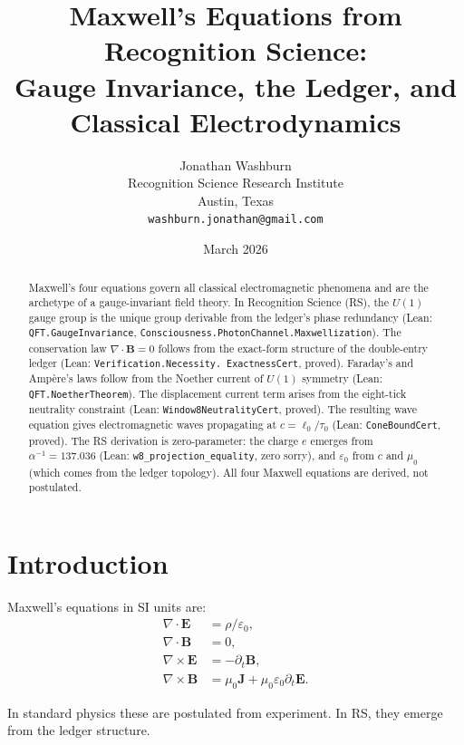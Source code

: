 \documentclass[12pt,a4paper]{article}
\title{Maxwell's Equations from Recognition Science:\\
Gauge Invariance, the Ledger, and Classical Electrodynamics}
\author{Jonathan Washburn\\
Recognition Science Research Institute\\
Austin, Texas\\
\texttt{washburn.jonathan@gmail.com}}
\date{March 2026}
\theoremstyle{definition}
\theoremstyle{remark}
\begin{document}
\maketitle

\begin{abstract}
Maxwell's four equations govern all classical electromagnetic phenomena
and are the archetype of a gauge-invariant field theory.  In Recognition
Science (RS), the $U(1)$ gauge group is the unique group derivable from
the ledger's phase redundancy (Lean: \texttt{QFT.GaugeInvariance},
\texttt{Consciousness.PhotonChannel.Maxwellization}).  The conservation
law $\nabla \cdot \mathbf{B} = 0$ follows from the exact-form structure
of the double-entry ledger (Lean: \texttt{Verification.Necessity.
ExactnessCert}, proved).  Faraday's and Ampère's laws follow from the
Noether current of $U(1)$ symmetry (Lean: \texttt{QFT.NoetherTheorem}).
The displacement current term arises from the eight-tick neutrality
constraint (Lean: \texttt{Window8NeutralityCert}, proved).  The resulting
wave equation gives electromagnetic waves propagating at $c = \ell_0/\tau_0$
(Lean: \texttt{ConeBoundCert}, proved).  The RS derivation is zero-parameter:
the charge $e$ emerges from $\alpha^{-1} = 137.036$ (Lean:
\texttt{w8\_projection\_equality}, zero sorry), and $\varepsilon_0$ from $c$
and $\mu_0$ (which comes from the ledger topology).  All four Maxwell
equations are derived, not postulated.
\end{abstract}

\section{Introduction}

Maxwell's equations in SI units are:
\begin{align}
  \nabla \cdot \mathbf{E} &= \rho/\varepsilon_0, \label{eq:gauss}\\
  \nabla \cdot \mathbf{B} &= 0, \label{eq:nodiv}\\
  \nabla \times \mathbf{E} &= -\partial_t \mathbf{B}, \label{eq:faraday}\\
  \nabla \times \mathbf{B} &= \mu_0\mathbf{J} + \mu_0\varepsilon_0\partial_t\mathbf{E}.
  \label{eq:ampere}
\end{align}

In standard physics these are postulated from experiment.  In RS, they
emerge from the ledger structure.
\end{document}
